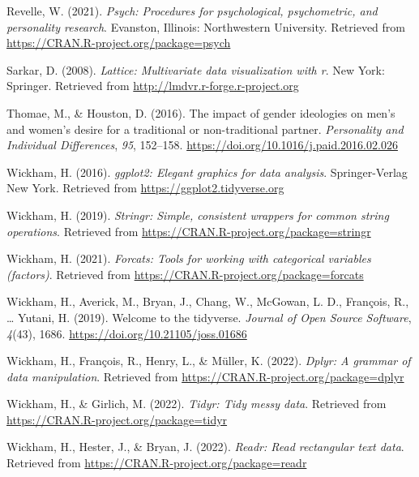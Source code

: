 \documentclass[
  man]{apa6}
\newlength{\cslhangindent}
\newlength{\cslentryspacingunit} %
\newenvironment{CSLReferences}[2] %
 {%
  \setlength{\parindent}{0pt}
  \ifodd #1
  \let\oldpar\par
  \def\par{\hangindent=\cslhangindent\oldpar}
  \fi
  \setlength{\parskip}{#2\cslentryspacingunit}
 }%
 {}
\begin{document}
\begin{CSLReferences}{1}{0}
\leavevmode{}%
Revelle, W. (2021). \emph{Psych: Procedures for psychological, psychometric, and personality research}. Evanston, Illinois: Northwestern University. Retrieved from \url{https://CRAN.R-project.org/package=psych}

\leavevmode{}%
Sarkar, D. (2008). \emph{Lattice: Multivariate data visualization with r}. New York: Springer. Retrieved from \url{http://lmdvr.r-forge.r-project.org}

\leavevmode{}%
Thomae, M., \& Houston, D. (2016). The impact of gender ideologies on men's and women's desire for a traditional or non-traditional partner. \emph{Personality and Individual Differences}, \emph{95}, 152--158. \url{https://doi.org/10.1016/j.paid.2016.02.026}

\leavevmode{}%
Wickham, H. (2016). \emph{ggplot2: Elegant graphics for data analysis}. Springer-Verlag New York. Retrieved from \url{https://ggplot2.tidyverse.org}

\leavevmode{}%
Wickham, H. (2019). \emph{Stringr: Simple, consistent wrappers for common string operations}. Retrieved from \url{https://CRAN.R-project.org/package=stringr}

\leavevmode{}%
Wickham, H. (2021). \emph{Forcats: Tools for working with categorical variables (factors)}. Retrieved from \url{https://CRAN.R-project.org/package=forcats}

\leavevmode{}%
Wickham, H., Averick, M., Bryan, J., Chang, W., McGowan, L. D., François, R., \ldots{} Yutani, H. (2019). Welcome to the {tidyverse}. \emph{Journal of Open Source Software}, \emph{4}(43), 1686. \url{https://doi.org/10.21105/joss.01686}

\leavevmode{}%
Wickham, H., François, R., Henry, L., \& Müller, K. (2022). \emph{Dplyr: A grammar of data manipulation}. Retrieved from \url{https://CRAN.R-project.org/package=dplyr}

\leavevmode{}%
Wickham, H., \& Girlich, M. (2022). \emph{Tidyr: Tidy messy data}. Retrieved from \url{https://CRAN.R-project.org/package=tidyr}

\leavevmode{}%
Wickham, H., Hester, J., \& Bryan, J. (2022). \emph{Readr: Read rectangular text data}. Retrieved from \url{https://CRAN.R-project.org/package=readr}


\end{CSLReferences}
\end{document}
